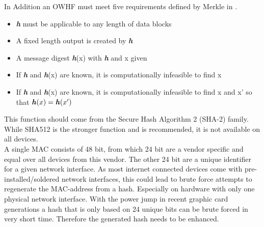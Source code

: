         In Addition an OWHF must meet five requirements defined by Merkle in \cite{merkle_secrecy_1979}.
        \begin{itemize}
            \item \textbf{\textit{h}} must be applicable to any length of data blocks
            \item A fixed length output is created by \textbf{\textit{h}}
            \item A message digest \textbf{\textit{h}}(x) with \textbf{\textit{h}} and x given
            \item If \textbf{\textit{h}} and \textbf{\textit{h}}(x) are known, it is computationally infeasible to find x
            \item If \textbf{\textit{h}} and \textbf{\textit{h}}(x) are known, it is computationally infeasible to find x and x' so that $\textbf{\textit{h}}(x) = \textbf{\textit{h}}(x')$
        \end{itemize}
        
        This function should come from the Secure Hash Algorithm 2 (SHA-2) family. While SHA512 is the stronger function and is recommended, it is not available on all devices.\\
        A single MAC consists of 48 bit, from which 24 bit are a vendor specific and equal over all devices from this vendor. The other 24 bit are a unique identifier for a given network interface. As most internet connected devices come with pre-installed/soldered network interfaces, this could lead to brute force attempts to regenerate the MAC-address from a hash. Especially on hardware with only one physical network interface. With the power jump in recent graphic card generations a hash that is only based on 24 unique bits can be brute forced in very short time. Therefore the generated hash needs to be enhanced.\\
        
